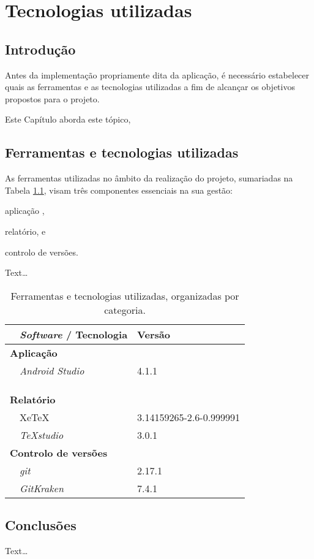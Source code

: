 \chapter{Tecnologias utilizadas}
\label{ch::tecno}


\section{Introdução}
\label{sec::tecno:intro}

Antes da implementação propriamente dita da aplicação, é necessário estabelecer quais as ferramentas e as tecnologias utilizadas a fim de alcançar os objetivos propostos para o projeto.

Este Capítulo aborda este tópico, %


\section{Ferramentas e tecnologias utilizadas}
\label{sec::tecno:tecnologia}

As ferramentas utilizadas no âmbito da realização do projeto, sumariadas na Tabela \ref{tab::ferramentas}, visam três componentes essenciais na sua gestão:
\begin{inparaenum}[1)]
	\item aplicação \opengl,
	\item relatório, e
	\item controlo de versões.
\end{inparaenum}

Text\ldots


\begin{table}[!htbp]
	\centering
	\begin{tabular}{p{1cm} l l}
		\toprule
		& {\bfseries \textit{Software} / Tecnologia} & {\bfseries Versão} \\
		\midrule
		\multicolumn{3}{l}{\bfseries Aplicação \opengl} \\
		& \textit{Android Studio} & 4.1.1 \\
		&  &  \\
		&  &  \\
		&  &  \\
		\midrule
		\multicolumn{3}{l}{\bfseries Relatório} \\
		& Xe\TeX & 3.14159265-2.6-0.999991 \\
		& \textit{TeXstudio}\textsuperscript{\textcopyright} & 3.0.1 \\
		\midrule
		\multicolumn{3}{l}{\bfseries Controlo de versões} \\
		& \textit{git} & 2.17.1 \\
		& \textit{GitKraken} & 7.4.1  \\
		\bottomrule
	\end{tabular}
	\caption[Ferramentas utilizadas]{Ferramentas e tecnologias utilizadas, organizadas por categoria.}
	\label{tab::ferramentas}
\end{table}



\section{Conclusões}
\label{sec::tecno:conclusao}

Text\ldots
